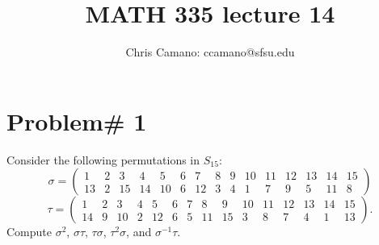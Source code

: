 \documentclass[11pt]{article}
\author{Chris Camano: ccamano@sfsu.edu}
\title{MATH 335  lecture 14 }
\date
\theoremstyle{definition}  %
\begin{document}
\maketitle


\section* {Problem# 1}
Consider the following permutations in $S_{15}$:
  $$ \sigma = \left( \begin{array}{ccccccccccccccc} 1 & 2 & 3 & 4 & 5 & 6 & 7 & 8 & 9 & 10 & 11 & 12 & 13 & 14 & 15 \\
                       13& 2 &15&14&10& 6 &12& 3 & 4 &   1 &   7 &   9 &   5 & 11 &   8 \end{array} \right) $$
  $$      \tau = \left( \begin{array}{ccccccccccccccc} 1 & 2 & 3 & 4 & 5 & 6 & 7 & 8 & 9 & 10 & 11 & 12 & 13 & 14 & 15 \\
                        14& 9 &10& 2 &12 & 6 & 5 & 11 & 15 &   3 &   8 &   7 &   4 & 1 &   13 \end{array} \right). $$
Compute $\sigma^2$, $\sigma \tau$, $\tau \sigma$, $\tau^2\sigma$, and $\sigma^{-1} \tau$.
\end{document}
